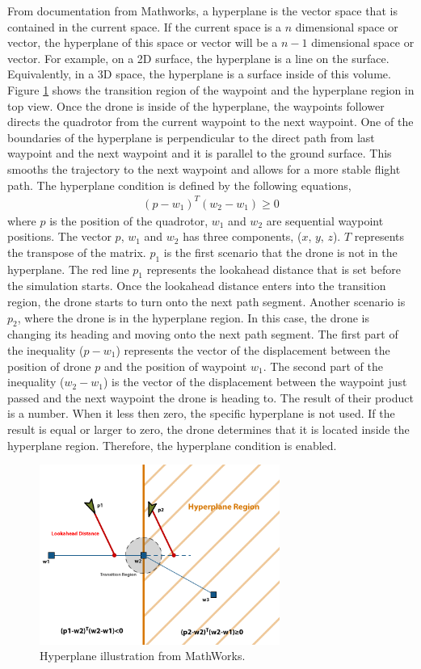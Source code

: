 From documentation from Mathworks, a hyperplane is the vector space that is contained in the current space. If the current space is a $n$ dimensional space or vector, the hyperplane of this space or vector will be a $n-1$ dimensional space or vector. For example, on a 2D surface, the hyperplane is a line on the surface. Equivalently, in a 3D space, the hyperplane is a surface inside of this volume. Figure \ref{fig:hyperplane} shows the transition region of the waypoint and the hyperplane region in top view. Once the drone is inside of the hyperplane, the waypoints follower directs the quadrotor from the current waypoint to the next waypoint. One of the boundaries of the hyperplane is perpendicular to the direct path from last waypoint and the next waypoint and it is parallel to the ground surface. This smooths the trajectory to the next waypoint and allows for a more stable flight path. The hyperplane condition is defined by the following equations,
\begin{gather}
    \left(p - w_1 \right)^T\left(w_2 - w_1\right) \geq 0
\end{gather}
where $p$ is the position of the quadrotor, $w_1$ and $w_2$ are sequential waypoint positions. The vector $p$, $w_1$ and $w_2$ has three components, ($x$, $y$, $z$). $T$ represents the transpose of the matrix. $p_1$ is the first scenario that the drone is not in the hyperplane. The red line $p_1$ represents the lookahead distance that is set before the simulation starts. Once the lookahead distance enters into the transition region, the drone starts to turn onto the next path segment. Another scenario is $p_2$, where the drone is in the hyperplane region. In this case, the drone is changing its heading and moving onto the next path segment. The first part of the inequality ($p-w_1$) represents the vector of the displacement between the position of drone $p$ and the position of waypoint $w_1$. The second part of the inequality ($w_2-w_1$) is the vector of the displacement between the waypoint just passed and the next waypoint the drone is heading to. The result of their product is a number. When it less then zero, the specific hyperplane is not used. If the result is equal or larger to zero, the drone determines that it is located inside the hyperplane region. Therefore, the hyperplane condition is enabled.
\begin{figure}[H]
    \centering
    \includegraphics[width = 0.7\textwidth]{./img/fig9.png}
    \caption[Hyperplane illustration.]{Hyperplane illustration from MathWorks.}
    \label{fig:hyperplane}
\end{figure}
